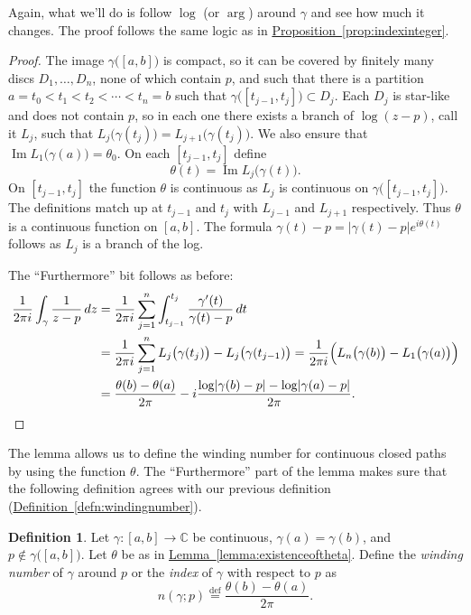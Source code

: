 \documentclass[12pt,openany]{book}
\renewcommand{\Im}{\operatorname{Im}}
\newcommand{\sabs}[1]{\lvert {#1} \rvert}
\newcommand{\C}{{\mathbb{C}}}
\newcommand{\myindex}[1]{#1\index{#1}}
\newcommand{\myquote}[1]{``#1''}
\theoremstyle{plain}
\theoremstyle{remark}
\theoremstyle{definition}
\newtheorem{defn}[thm]{Definition}
\theoremstyle{exercise}
\theoremstyle{example}
\newcommand{\propref}[1]{\hyperref[#1]{Proposition~\ref*{#1}}}
\newcommand{\lemmaref}[1]{\hyperref[#1]{Lemma~\ref*{#1}}}
\newcommand{\defnref}[1]{\hyperref[#1]{Definition~\ref*{#1}}}
\begin{document}
Again, what we'll do is follow $\log$ (or $\arg$) around $\gamma$ and see
how much it changes.  The proof follows the same logic as in
\propref{prop:indexinteger}.

\begin{proof}
The image $\gamma\bigl([a,b]\bigr)$ is compact, so it can be covered by finitely many
discs $D_1,\ldots,D_n$, none of which contain $p$, and such that there is a
partition $a = t_0 < t_1 < t_2 < \cdots < t_n = b$ such that
$\gamma\bigl([t_{j-1},t_j]\bigr) \subset D_j$.  Each $D_j$ is star-like and
does not contain $p$,
so in each one there exists a branch of $\log (z-p)$, call it $L_j$,
such that $L_j\bigl(\gamma(t_j)\bigr) = L_{j+1}\bigl(\gamma(t_j)\bigr)$.
We also ensure that $\Im L_1\bigl(\gamma(a)\bigr) = \theta_0$.
On each $[t_{j-1},t_j]$ define
\begin{equation*}
\theta(t)
=
\Im L_j\bigl(\gamma(t)\bigr) .
\end{equation*}
On $[t_{j-1},t_j]$ the function $\theta$ is continuous as $L_j$ is continuous on 
$\gamma\bigl([t_{j-1},t_j]\bigr)$.  The definitions match up at $t_{j-1}$
and $t_{j}$ with $L_{j-1}$ and $L_{j+1}$ respectively.  Thus
$\theta$ is a continuous function on $[a,b]$.
The formula $\gamma(t)-p = \sabs{\gamma(t)-p} e^{i\theta(t)}$ follows as
$L_j$ is a branch of the log.

The \myquote{Furthermore} bit follows as before:
\begin{equation*}
\begin{split}
\frac{1}{2\pi i} \int_\gamma \frac{1}{z-p} \, dz
& =
\frac{1}{2\pi i} \sum_{j=1}^n \int_{t_{j-1}}^{t_j} \frac{\gamma'(t)}{\gamma(t)-p} \, dt
\\
& =
\frac{1}{2\pi i} \sum_{j=1}^n L_j\bigl(\gamma(t_j)\bigr) -
L_j\bigl(\gamma(t_{j-1})\bigr)
=
\frac{1}{2\pi i} \Bigl( L_n\bigl(\gamma(b)\bigr) - L_1\bigl(\gamma(a)\bigr) \Bigr) 
\\
& =
\frac{\theta(b)-\theta(a)}{2\pi}
- i \frac{\log \sabs{\gamma(b)-p} - \log \sabs{\gamma(a)-p}}{2\pi} .
\qedhere
\end{split}
\end{equation*}
\end{proof}

The lemma allows us to define the winding number for continuous closed paths
by using the function $\theta$.  The \myquote{Furthermore} part of the
lemma makes sure that the following definition agrees with our previous
definition (\defnref{defn:windingnumber}).

\begin{defn}
Let $\gamma \colon [a,b] \to \C$ be continuous, $\gamma(a) = \gamma(b)$, and
$p \notin \gamma\bigl([a,b]\bigr)$.  Let $\theta$ be as in
\lemmaref{lemma:existenceoftheta}.  Define the
\emph{\myindex{winding number}} of $\gamma$ around $p$ or
the \emph{\myindex{index}} of $\gamma$ with respect to $p$
as
%
\begin{equation*}
n(\gamma;p)
\overset{\text{def}}{=}
\frac{\theta(b)-\theta(a)}{2\pi}.
\end{equation*}
\end{defn}
\end{document}
